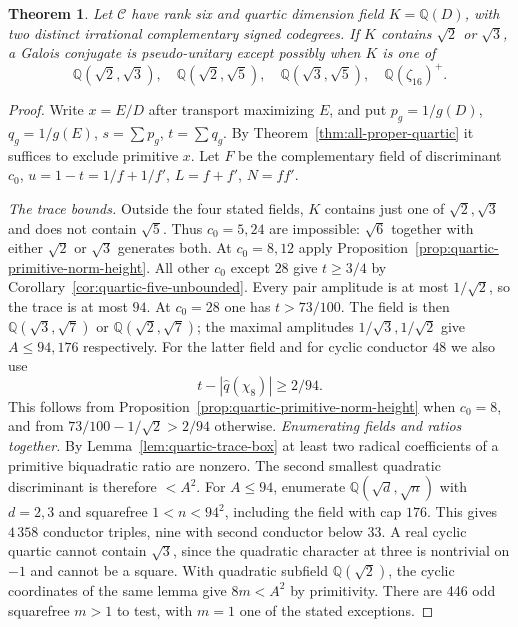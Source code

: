 \documentclass[11pt,reqno]{amsart}
\newtheorem{theorem}{Theorem}[section]
\theoremstyle{remark}\newtheorem{remark}[theorem]{Remark}
\numberwithin{equation}{section}
\begin{document}
\begin{theorem}\label{thm:quartic-silver-fields}
Let $\mathcal C$ have rank six and quartic dimension field $K=\mathbb Q(D)$,
with two distinct irrational complementary signed codegrees. If $K$
contains $\sqrt2$ or $\sqrt3$, a Galois conjugate is pseudo-unitary except possibly when $K$ is one of
\[
 \mathbb Q(\sqrt2,\sqrt3),\quad \mathbb Q(\sqrt2,\sqrt5),\quad
 \mathbb Q(\sqrt3,\sqrt5),\quad \mathbb Q(\zeta_{16})^+.
\]
\end{theorem}
\begin{proof}
Write $x=E/D$ after transport maximizing $E$, and put
$p_g=1/g(D)$, $q_g=1/g(E)$, $s=\sum p_g$, $t=\sum q_g$. By
Theorem~\ref{thm:all-proper-quartic} it suffices to exclude primitive
$x$. Let $F$ be the complementary field of discriminant $c_0$,
$u=1-t=1/f+1/f'$, $L=f+f'$, $N=ff'$.

\smallskip\noindent\emph{The trace bounds.}
Outside the four stated fields, $K$ contains just one of
$\sqrt2,\sqrt3$ and does not contain $\sqrt5$. Thus $c_0=5,24$
are impossible: $\sqrt6$ together with either $\sqrt2$ or $\sqrt3$
generates both. At $c_0=8,12$ apply
Proposition~\ref{prop:quartic-primitive-norm-height}. All other
$c_0$ except $28$ give $t\ge3/4$ by
Corollary~\ref{cor:quartic-five-unbounded}. Every pair amplitude
is at most $1/\sqrt2$, so the trace is at most $94$.
At $c_0=28$ one has $t>73/100$. The field is then
$\mathbb Q(\sqrt3,\sqrt7)$ or $\mathbb Q(\sqrt2,\sqrt7)$;
the maximal amplitudes $1/\sqrt3,1/\sqrt2$ give $A\le94,176$
respectively. For the latter field and for cyclic conductor $48$
we also use
\[
             t-|\widehat q(\chi_8)|\ge2/94.                 \tag{Q1}
\]
This follows from Proposition~\ref{prop:quartic-primitive-norm-height}
when $c_0=8$, and from $73/100-1/\sqrt2>2/94$ otherwise.
\smallskip\noindent\emph{Enumerating fields and ratios together.}
By Lemma~\ref{lem:quartic-trace-box} at least two radical coefficients
of a primitive biquadratic ratio are nonzero. The second smallest
quadratic discriminant is therefore $<A^2$. For $A\le94$, enumerate
$\mathbb Q(\sqrt d,\sqrt n)$ with $d=2,3$ and squarefree
$1<n<94^2$, including the field with cap $176$. This gives
$4\,358$ conductor triples, nine with second conductor below $33$. A real cyclic quartic cannot
contain $\sqrt3$, since the quadratic character at three is nontrivial
on $-1$ and cannot be a square. With quadratic subfield
$\mathbb Q(\sqrt2)$, the cyclic coordinates of the same lemma give
$8m<A^2$ by primitivity. There are 446 odd squarefree $m>1$ to test,
with $m=1$ one of the stated exceptions.


\end{proof}
\end{document}
